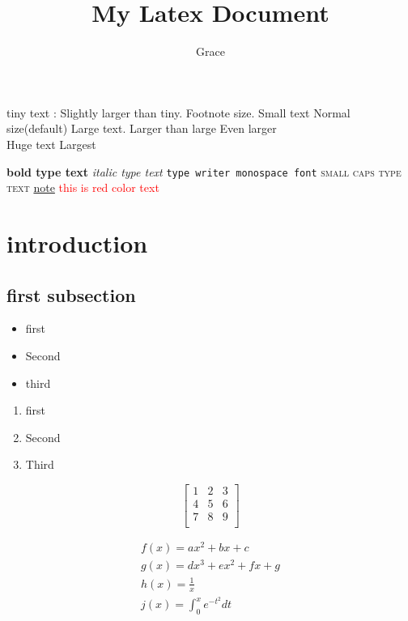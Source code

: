 \documentclass{article}
\begin{document}
	\tableofcontents
	\newpage
	\title{My Latex Document}
	\author{Grace}
	
	\tiny tiny text
	\scriptsize: Slightly larger than tiny.
	\footnotesize Footnote size.
	\small Small text
	\normalsize Normal size(default)
	\large Large text.
	\Large Larger than large
	\LARGE Even larger \\
	\huge Huge text
	\Huge Largest
	
	\textbf{bold type text}
	\textit{italic type text}
	\texttt{type writer monospace font}
	\textsc{small caps type text}
	\underline{note}
	\textcolor{red}{this is red color text}
	
	\section{introduction}
	\subsection{first subsection}
	\begin{itemize}
		\section{itemize}
		\item first
		\item Second
		\item third 
	\end{itemize}
	\begin{enumerate}
		\section{Enumerate}
		\item first 
		\item Second 
		\item Third
	\end{enumerate}
	\[
	\begin{bmatrix}
    1 & 2 & 3 \\
    4 & 5 & 6 \\
	7 & 8 & 9 \\

	\end{bmatrix}
	\]
	
	\begin{gather}
		f(x) = ax^2 + bx +c \\
		g(x) = dx^3 + ex^2 + fx + g \\
		h(x) = \frac{1}{x} \\
		j(x) = \int_{0}^{x}e^{-t^2}dt
	\end{gather}
	
\end{document}
